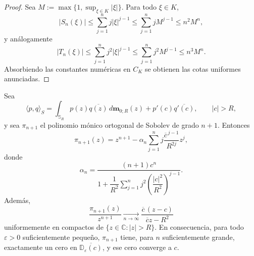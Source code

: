 \begin{proof}
	Sea $M:=\max\{1,\sup_{\xi\in K}|\xi|\}$. Para todo $\xi\in K$,
	\[
		|S_n(\xi)|\le \sum_{j=1}^n j|\xi|^{j-1}
		\le \sum_{j=1}^n jM^{j-1}
		\le n^2 M^n,
	\]
	y análogamente
	\[
		|T_n(\xi)|\le \sum_{j=1}^n j^2|\xi|^{j-1}
		\le \sum_{j=1}^n j^2M^{j-1}
		\le n^3 M^n.
	\]
	Absorbiendo las constantes numéricas en $C_K$ se obtienen las cotas uniformes anunciadas.
\end{proof}

\begin{lem}\label{lem:modelo_un_atomo_exterior}
	Sea
	\[
		\langle p,q\rangle_S
		=
		\int_{\mathbb S_R}p(z)\overline{q(z)}\,d\mathbf m_{0;R}(z)
		+
		p'(c)\overline{q'(c)},
		\qquad |c|>R,
	\]
	y sea $\pi_{n+1}$ el polinomio mónico ortogonal de Sobolev de grado $n+1$.
	Entonces
	\[
		\pi_{n+1}(z)=z^{n+1}-\alpha_n\sum_{j=1}^n j\frac{\overline c^{\,j-1}}{R^{2j}}z^j,
	\]
	donde
	\[
		\alpha_n=
		\frac{(n+1)c^n}{1+\dfrac1{R^2}\sum_{j=1}^n j^2\left(\dfrac{|c|^2}{R^2}\right)^{j-1}}.
	\]
	Además,
	\[
		\frac{\pi_{n+1}(z)}{z^{n+1}}
		\xrightarrow[n\to\infty]{}
		\frac{\overline c\,(z-c)}{\overline c z-R^2}
	\]
	uniformemente en compactos de $\{z\in\mathbb C:|z|>R\}$. En consecuencia, para todo $\varepsilon>0$ suficientemente pequeño, $\pi_{n+1}$ tiene, para $n$ suficientemente grande, exactamente un cero en $\overline{\mathbb D_\varepsilon(c)}$, y ese cero converge a $c$.
\end{lem}

